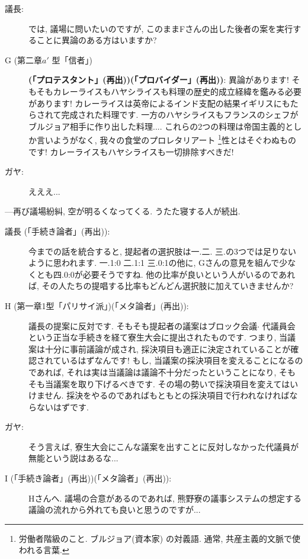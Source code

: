 \documentclass[10pt,b5jsbook,dvips,dvipdfmx,openany]{jsbook}
\theoremstyle{definition}
\begin{document}
\begin{multicols}{2}
\begin{description}
		\item[議長: ]では, 議場に問いたいのですが, このままFさんの出した後者の案を実行することに異論のある方はいますか?

		\item[G (第二章$a'$ 型「信者」)]\textbf{(「プロテスタント」(再出))(「プロバイダー」(再出))}: 異論があります! そもそもカレーライスもハヤシライスも料理の歴史的成立経緯を鑑みる必要があります! カレーライスは英帝によるインド支配の結果イギリスにもたらされて完成された料理です. 一方のハヤシライスもフランスのシェフがブルジョア相手に作り出した料理.... これらの2つの料理は帝国主義的としか言いようがなく, 我々の食堂のプロレタリアート \footnote{労働者階級のこと. ブルジョア(資本家) の対義語. 通常, 共産主義的文脈で使われる言葉. }性とはそぐわぬものです! カレーライスもハヤシライスも一切排除すべきだ!

		\item[ガヤ: ]えええ...

		\end{description}

		---再び議場紛糾, 空が明るくなってくる. うたた寝する人が続出.

		\begin{description}

		\item[議長 (「手続き論者」(再出)): ]今までの話を統合すると, 提起者の選択肢は一.二. 三.の3つでは足りないように思われます. 一.1:0 二.1:1 三.0:1の他に, Gさんの意見を組んで少なくとも四.0:0が必要そうですね. 他の比率が良いという人がいるのであれば, その人たちの提唱する比率もどんどん選択肢に加えていきませんか?

		\item[H (第一章1型「パリサイ派」)(「メタ論者」(再出)): ]議長の提案に反対です. そもそも提起者の議案はブロック会議$ \cdot $ 代議員会という正当な手続きを経て寮生大会に提出されたものです. つまり, 当議案は十分に事前議論が成され, 採決項目も適正に決定されていることが確認されているはずなんです! もし, 当議案の採決項目を変えることになるのであれば, それは実は当議論は議論不十分だったということになり, そもそも当議案を取り下げるべきです. その場の勢いで採決項目を変えてはいけません. 採決をやるのであればもともとの採決項目で行われなければならないはずです.

		\item[ガヤ: ]そう言えば, 寮生大会にこんな議案を出すことに反対しなかった代議員が無能という説はあるな...

		\item[I (「手続き論者」(再出))(「メタ論者」(再出)): ] Hさんへ. 議場の合意があるのであれば, 熊野寮の議事システムの想定する議論の流れから外れても良いと思うのですが...


\end{description}
\end{multicols}
\end{document}
